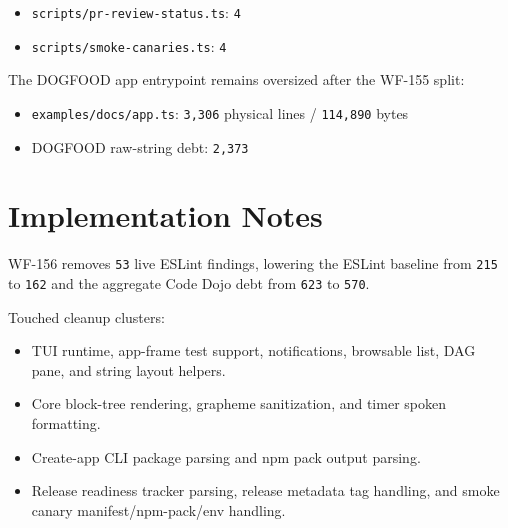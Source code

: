 \begin{itemize}
\item
  \texttt{s\allowbreak{}c\allowbreak{}r\allowbreak{}i\allowbreak{}p\allowbreak{}t\allowbreak{}s\allowbreak{}/\allowbreak{}p\allowbreak{}r\allowbreak{}-\allowbreak{}r\allowbreak{}e\allowbreak{}v\allowbreak{}i\allowbreak{}e\allowbreak{}w\allowbreak{}-\allowbreak{}s\allowbreak{}t\allowbreak{}a\allowbreak{}t\allowbreak{}u\allowbreak{}s\allowbreak{}.\allowbreak{}t\allowbreak{}s}: \texttt{4}
\item
  \texttt{s\allowbreak{}c\allowbreak{}r\allowbreak{}i\allowbreak{}p\allowbreak{}t\allowbreak{}s\allowbreak{}/\allowbreak{}s\allowbreak{}m\allowbreak{}o\allowbreak{}k\allowbreak{}e\allowbreak{}-\allowbreak{}c\allowbreak{}a\allowbreak{}n\allowbreak{}a\allowbreak{}r\allowbreak{}i\allowbreak{}e\allowbreak{}s\allowbreak{}.\allowbreak{}t\allowbreak{}s}: \texttt{4}
\end{itemize}

The DOGFOOD app entrypoint remains oversized after the WF-155 split:

\begin{itemize}
\tightlist
\item
  \texttt{e\allowbreak{}x\allowbreak{}a\allowbreak{}m\allowbreak{}p\allowbreak{}l\allowbreak{}e\allowbreak{}s\allowbreak{}/\allowbreak{}d\allowbreak{}o\allowbreak{}c\allowbreak{}s\allowbreak{}/\allowbreak{}a\allowbreak{}p\allowbreak{}p\allowbreak{}.\allowbreak{}t\allowbreak{}s}: \texttt{3\allowbreak{},\allowbreak{}3\allowbreak{}0\allowbreak{}6} physical lines / \texttt{1\allowbreak{}1\allowbreak{}4\allowbreak{},\allowbreak{}8\allowbreak{}9\allowbreak{}0} bytes
\item
  DOGFOOD raw-string debt: \texttt{2\allowbreak{},\allowbreak{}3\allowbreak{}7\allowbreak{}3}
\end{itemize}

\section{Implementation Notes}\label{record-238-implementation-notes}

WF-156 removes \texttt{5\allowbreak{}3} live ESLint findings, lowering the ESLint baseline from \texttt{2\allowbreak{}1\allowbreak{}5} to \texttt{1\allowbreak{}6\allowbreak{}2} and the aggregate Code Dojo debt from \texttt{6\allowbreak{}2\allowbreak{}3} to \texttt{5\allowbreak{}7\allowbreak{}0}.

Touched cleanup clusters:

\begin{itemize}
\tightlist
\item
  TUI runtime, app-frame test support, notifications, browsable list, DAG pane, and string layout helpers.
\item
  Core block-tree rendering, grapheme sanitization, and timer spoken formatting.
\item
  Create-app CLI package parsing and npm pack output parsing.
\item
  Release readiness tracker parsing, release metadata tag handling, and smoke canary manifest/npm-pack/env handling.
\end{itemize}

